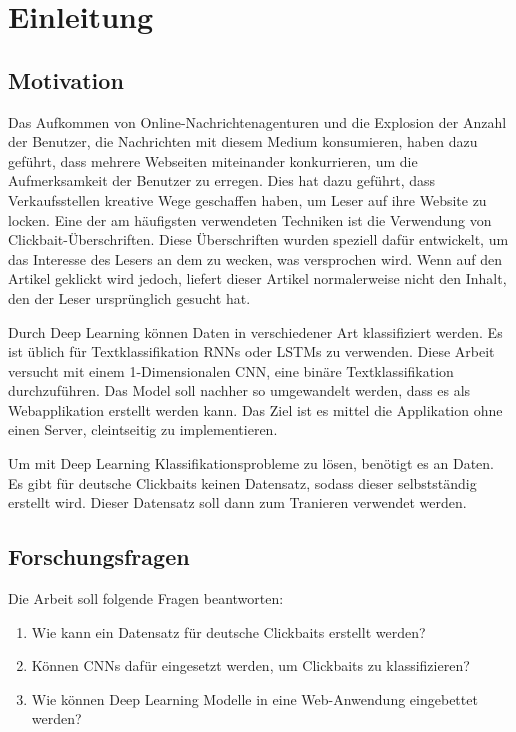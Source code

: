 \chapter{Einleitung}\label{ch1}

\section{Motivation}

Das Aufkommen von Online-Nachrichtenagenturen und die Explosion der Anzahl der Benutzer, die Nachrichten mit diesem Medium konsumieren, haben dazu geführt, dass mehrere Webseiten miteinander konkurrieren, um die Aufmerksamkeit der Benutzer zu erregen. Dies hat dazu geführt, dass Verkaufsstellen kreative Wege geschaffen haben, um Leser auf ihre Website zu locken. Eine der am häufigsten verwendeten Techniken ist die Verwendung von Clickbait-Überschriften. Diese Überschriften wurden speziell dafür entwickelt, um das Interesse des Lesers an dem zu wecken, was versprochen wird. Wenn auf den Artikel geklickt wird jedoch, liefert dieser Artikel normalerweise nicht den Inhalt, den der Leser ursprünglich gesucht hat. 

Durch Deep Learning können Daten in verschiedener Art klassifiziert werden. Es ist üblich für Textklassifikation RNNs oder LSTMs zu verwenden. Diese Arbeit versucht mit einem 1-Dimensionalen CNN, eine binäre Textklassifikation durchzuführen. Das Model soll nachher so umgewandelt werden, dass es als Webapplikation erstellt werden kann. Das Ziel ist es mittel die Applikation ohne einen Server, cleintseitig zu implementieren.

Um mit Deep Learning Klassifikationsprobleme zu lösen, benötigt es an Daten. Es gibt für deutsche Clickbaits keinen Datensatz, sodass dieser selbstständig erstellt wird. Dieser Datensatz soll dann zum Tranieren verwendet werden. 


\section{Forschungsfragen}
Die Arbeit soll folgende Fragen beantworten:
\begin{enumerate}
    \item Wie kann ein Datensatz für deutsche Clickbaits erstellt werden?
    \item Können CNNs dafür eingesetzt werden, um Clickbaits zu klassifizieren?
    \item Wie können Deep Learning Modelle in eine Web-Anwendung eingebettet werden?
\end{enumerate}

